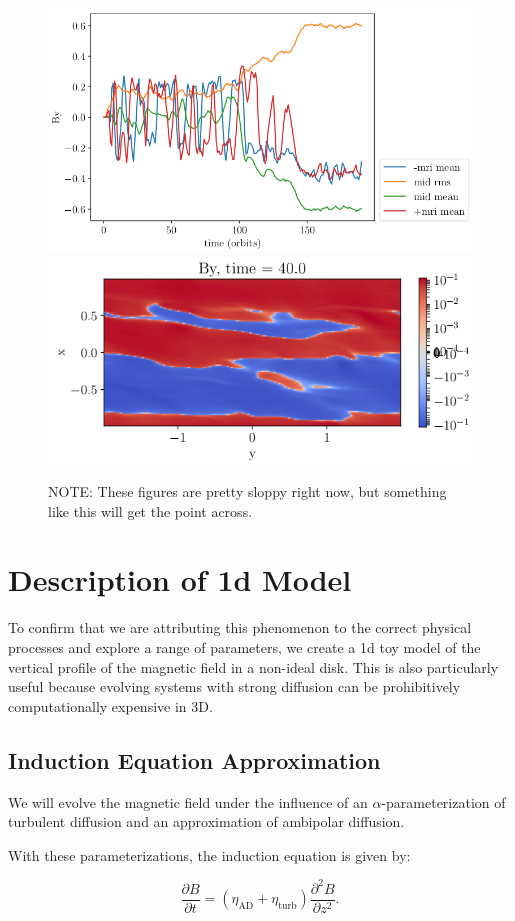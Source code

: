 \begin{figure}[p]
\centering
\includegraphics[width=0.5\columnwidth]{figs/figsChapter5/3D/By_vs_time.png}
\includegraphics[width=0.5\columnwidth]{figs/figsChapter5/3D/xyPlaneBy.png}
\caption{NOTE: These figures are pretty sloppy right now, but something like this will get the point across.}
\label{fig3dPlots}
\end{figure}





\section{Description of 1d Model}
To confirm that we are attributing this phenomenon to the correct physical processes and explore a range of parameters, we create a 1d toy model of the vertical profile of the magnetic field in a non-ideal disk.  This is also particularly useful because evolving systems with strong diffusion can be prohibitively computationally expensive in 3D.  


\subsection{Induction Equation Approximation}
We will evolve the magnetic field under the influence of an $\alpha$-parameterization of turbulent diffusion and an approximation of ambipolar diffusion.  

With these parameterizations, the induction equation is given by:

\begin{equation}
\frac{\partial B}{\partial t} = (\eta_{\text{AD}} + \eta_{\text{turb}}) \frac{\partial^2 B}{\partial z^2}.  \end{equation}

